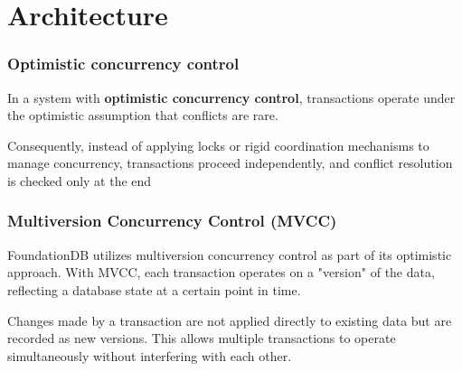\section{Architecture}

\begin{frame}
	\frametitle{Optimistic concurrency control}
 In a system with \textbf{optimistic concurrency control}, transactions operate under the optimistic assumption that conflicts are rare. 
\vspace{0.5cm}

 Consequently, instead of applying locks or rigid coordination mechanisms to manage concurrency, transactions proceed independently, and conflict resolution is checked only at the end
\end{frame}

\begin{frame}
	\frametitle{Multiversion Concurrency Control (MVCC)}
  FoundationDB utilizes multiversion concurrency control as part of its optimistic approach. With MVCC, each transaction operates on a "version" of the data, reflecting a database state at a certain point in time. \vspace{0.5cm}
  
  Changes made by a transaction are not applied directly to existing data but are recorded as new versions. This allows multiple transactions to operate simultaneously without interfering with each other.
\end{frame}


